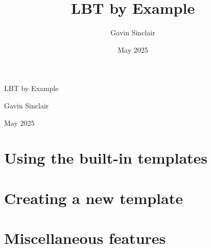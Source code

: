\documentclass[12pt,oneside]{memoir}
\title{LBT by Example}
\author{Gavin Sinclair}
\date{May 2025}
\begin{document}

\frontmatter  %

\begin{titlingpage}
  \centering
  \vspace*{3cm}
  {\Huge LBT by Example\par}
  \vspace{1cm}
  {\large Gavin Sinclair\par}
  \vfill
  {\large May 2025\par}
\end{titlingpage}

\tableofcontents
{}

\mainmatter   %

\part{Using the built-in templates}




\part{Creating a new template}

\part{Miscellaneous features}

\appendix

\backmatter
\end{document}
